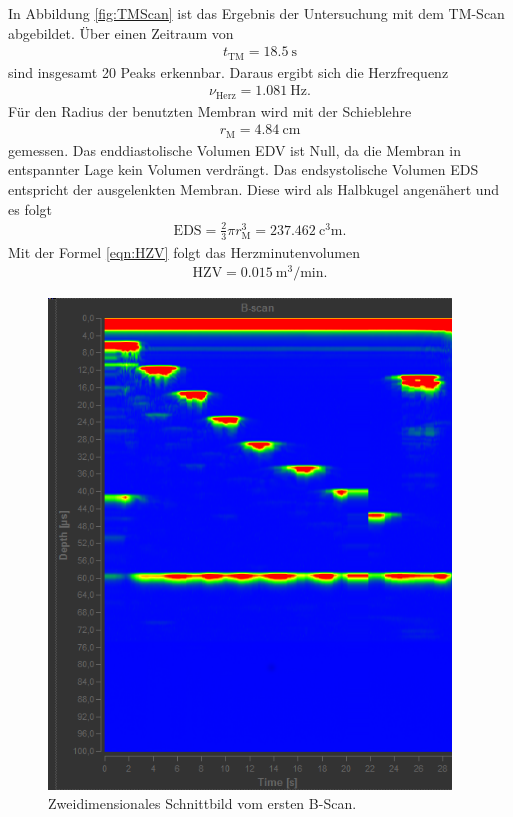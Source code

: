 In Abbildung \ref{fig:TMScan} ist das Ergebnis der Untersuchung mit dem TM-Scan
abgebildet. Über einen Zeitraum von
\begin{align}
  t_\text{TM} = \SI{18.5}{\second}
\end{align}
sind insgesamt 20 Peaks erkennbar.
Daraus ergibt sich die Herzfrequenz
\begin{align}
  \nu_\text{Herz} = \SI{1.081}{\hertz}.
\end{align}
Für den Radius der benutzten Membran wird mit der Schieblehre
\begin{align}
  r_\text{M} = \SI{4.84}{\centi\meter}
\end{align}
gemessen.
Das enddiastolische Volumen EDV ist Null, da die Membran in entspannter
Lage kein Volumen verdrängt.
Das endsystolische Volumen EDS entspricht der ausgelenkten Membran. Diese
wird als Halbkugel angenähert und es folgt
\begin{align}
  \text{EDS} = \frac{2}{3} \pi r_\text{M}^3 = \SI{237.462}{\cubic\centi\meter}.
\end{align}
Mit der Formel \eqref{eqn:HZV} folgt das Herzminutenvolumen
\begin{align}
  \text{HZV} = \SI{0.015}{\cubic\meter\per\minute}.
\end{align}

\begin{figure}
  \centering
  \includegraphics[height=13cm]{Daten/B-Scan1.png}
  \caption{Zweidimensionales Schnittbild vom ersten B-Scan.}
  \label{fig:BScan1}
\end{figure}

